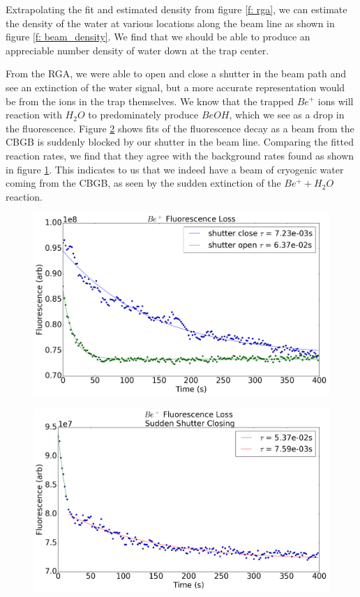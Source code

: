 Extrapolating the fit and estimated density from figure \ref{f: rga}, we can estimate the density of the water at various locations along the beam line as shown in figure \ref{f: beam_density}. We find that we should be able to produce an appreciable number density of water down at the trap center.

From the RGA, we were able to open and close a shutter in the beam path and see an extinction of the water signal, but a more accurate representation would be from the ions in the trap themselves. We know that the trapped $Be^+$ ions will reaction with $H_2O$ to predominately produce $BeOH$, which we see as a drop in the fluorescence. Figure \ref{f: shutter_closing} shows fits of the fluorescence decay as a beam from the CBGB is suddenly blocked by our shutter in the beam line. Comparing the fitted reaction rates, we find that they agree with the background rates found as shown in figure \ref{f: shutter_bkg}. This indicates to us that we indeed have a beam of cryogenic water coming from the CBGB, as seen by the sudden extinction of the $Be^+ + H_2O$ reaction.

\begin{figure}[H] \label{f: shutter_bkg}
	\centering
	\includegraphics[width=1\textwidth]{images/CBGB_sudden_shutter_flow_bkg.png}
	\caption{}
\end{figure}

\begin{figure}[H] \label{f: shutter_closing}
	\centering
	\includegraphics[width=1\textwidth]{images/CBGB_sudden_shutter_flow.png}
	\caption{}
\end{figure}